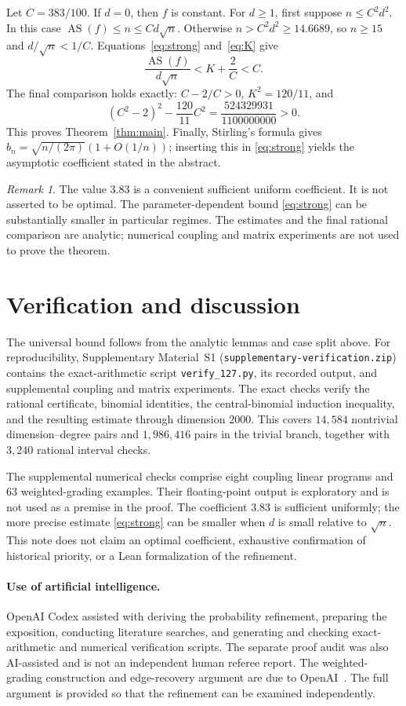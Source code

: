 \documentclass[11pt]{article}
\theoremstyle{remark}
\newtheorem{remark}[theorem]{Remark}
\newcommand{\AS}{\operatorname{AS}}
\begin{document}
Let $C=383/100$. If $d=0$, then $f$ is constant.
For $d\ge1$, first suppose $n\le C^2d^2$. In this case
$\AS(f)\le n\le Cd\sqrt n$.
Otherwise $n>C^2d^2\ge14.6689$, so $n\ge15$ and $d/\sqrt n<1/C$.
Equations~\eqref{eq:strong} and~\eqref{eq:K} give
\[
 \frac{\AS(f)}{d\sqrt n}<K+\frac2C<C.
\]
The final comparison holds exactly: $C-2/C>0$, $K^2=120/11$, and
\[
 (C^2-2)^2-\frac{120}{11}C^2
 =\frac{524329931}{1100000000}>0.
\]
This proves Theorem~\ref{thm:main}.
Finally, Stirling's formula gives
$b_n=\sqrt{n/(2\pi)}(1+O(1/n))$; inserting this in \eqref{eq:strong}
yields the asymptotic coefficient stated in the abstract.

\begin{remark}
The value $3.83$ is a convenient sufficient uniform coefficient.
It is not asserted to be optimal. The parameter-dependent bound
\eqref{eq:strong} can be substantially smaller in particular regimes.
The estimates and the final rational comparison are analytic; numerical
coupling and matrix experiments are not used to prove the theorem.
\end{remark}

\section{Verification and discussion}
The universal bound follows from the analytic lemmas and case split above.
For reproducibility, Supplementary Material~S1
(\texttt{supplementary-verification.zip}) contains the exact-arithmetic
script \texttt{verify\_127.py}, its recorded output, and supplemental
coupling and matrix experiments. The exact checks verify the rational
certificate, binomial identities, the central-binomial induction inequality,
and the resulting estimate through dimension $2000$. This covers $14{,}584$
nontrivial dimension--degree pairs and $1{,}986{,}416$ pairs in the trivial
branch, together with $3{,}240$ rational interval checks.

The supplemental numerical checks comprise eight coupling linear programs
and $63$ weighted-grading examples. Their floating-point output is
exploratory and is not used as a premise in the proof. The coefficient
$3.83$ is sufficient uniformly; the more precise estimate
\eqref{eq:strong} can be smaller when $d$ is small relative to $\sqrt n$.
This note does not claim an optimal coefficient, exhaustive confirmation
of historical priority, or a Lean formalization of the refinement.

\paragraph{Use of artificial intelligence.}
OpenAI Codex assisted with deriving the probability refinement, preparing
the exposition, conducting literature searches, and generating and checking
exact-arithmetic and numerical verification scripts. The separate proof
audit was also AI-assisted and is not an independent human referee report.
The weighted-grading construction and edge-recovery argument are due to
OpenAI~\cite{OpenAI}. The full argument is provided so that the refinement
can be examined independently.
\end{document}
